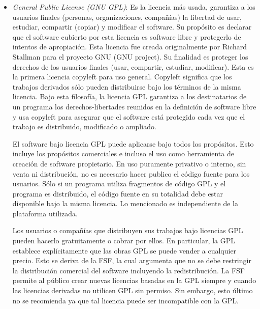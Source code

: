 \begin {itemize}
\item \textit{General Public License (GNU GPL)}: Es la licencia más
  usada, garantiza a los usuarios finales (personas, organizaciones,
  compañías) la libertad de usar, estudiar, compartir (copiar) y
  modificar el software. Su propósito es declarar que el software
  cubierto por esta licencia es software libre y protegerlo de
  intentos de apropiación. Esta licencia fue creada originalmente por Richard
  Stallman para el proyecto GNU (GNU project). Su finalidad es proteger los derechos de
  los usuarios finales (usar, compartir, estudiar, modificar). Esta es
  la primera licencia copyleft para uso general. Copyleft significa
  que los trabajos derivados sólo pueden distribuirse bajo los
  términos de la misma licencia. Bajo esta filosofía, la licencia GPL
  garantiza a los destinatarios de un programa los derechos-libertades
  reunidos en la definición de software libre y usa copyleft para
  asegurar que el software está protegido cada vez que el trabajo es
  distribuido, modificado o ampliado.

  El software bajo licencia GPL puede aplicarse bajo todos los
  propósitos. Esto incluye los propósitos comerciales e incluso el uso
  como herramienta de creación de software propietario. En uso
  puramente privativo o interno, sin venta ni distribución, no es
  necesario hacer publico el código fuente para los usuarios. Sólo si
  un programa utiliza fragmentos de código GPL y el programa es
  distribuido, el código fuente en su totalidad debe estar disponible
  bajo la misma licencia. Lo mencionado es independiente de la
  plataforma utilizada. 

  Los usuarios o compañías que distribuyen sus trabajos bajo licencias
  GPL pueden hacerlo gratuitamente o cobrar por ellos. En particular,
  la GPL establece explícitamente que las obras GPL se puede vender a
  cualquier precio. Esto se deriva de la FSF, la cual argumenta que no
  se debe restringir la distribución comercial del software incluyendo
  la redistribución. La FSF permite al público crear nuevas licencias
  basadas en la GPL siempre y cuando las licencias derivadas no
  utilicen GPL sin permiso. Sin embargo, esto último no se recomienda
  ya que tal licencia puede ser incompatible con la GPL.




\end{itemize}
